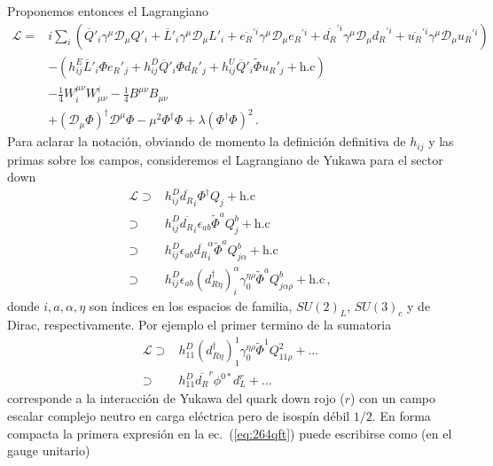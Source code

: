 \begin{frame}
Proponemos entonces el Lagrangiano
\begin{align}
\label{eq:265qft} 
    \mathcal{L}=&i\sum_i\left(\overline{Q}'_i\gamma^\mu\mathcal{D}_\mu Q'_i+\overline{L}'_i\gamma^\mu\mathcal{D}_\mu L'_i+
\overline{e_R}^{\prime i}\gamma^\mu\mathcal{D}_\mu {e_R}^{\prime i}+\overline{d_R}^{\prime i}\gamma^\mu\mathcal{D}_\mu {d_R}^{\prime i}+\overline{u_R}^{\prime i}\gamma^\mu\mathcal{D}_\mu {u_R}^{\prime i}\right)
\nonumber\\
     &-(h_{ij}^E\overline{L}'_i\Phi {e_R}'_j+h_{ij}^D\overline{Q}'_i\Phi {d_R}'_j+h_{ij}^U\overline{Q}'_i\widetilde{\Phi}{u_R}'_j+\text{h.c})\nonumber\\
     &-\tfrac{1}{4}W^{\mu\nu}_i W_{\mu\nu}^i-\tfrac{1}{4}B^{\mu\nu} B_{\mu\nu}\nonumber\\
     &+(\mathcal{D}_\mu\Phi)^\dagger\mathcal{D}^\mu\Phi-\mu^2\Phi^\dagger\Phi+\lambda(\Phi^\dagger\Phi)^2\,.
\end{align}
Para aclarar la notación, obviando de momento la definición definitiva de $h_{ij}$ y las primas sobre los campos, consideremos el Lagrangiano de Yukawa para el sector down
\begin{align}
  \label{eq:264qft}
  \mathcal{L}\supset&h^D_{ij}\overline{d_R}_i\Phi^\dagger Q_j+\text{h.c}\nonumber\\
\supset&h^D_{ij}\overline{d_R}_i\epsilon_{ab}\widetilde{\Phi}^aQ_j^b+\text{h.c}\nonumber\\
\supset&h^D_{ij}\epsilon_{ab}\overline{d_R}_i^\alpha\widetilde{\Phi}^aQ_{j\alpha}^b+\text{h.c}\nonumber\\
\supset&h^D_{ij}\epsilon_{ab}{(d_{R\eta}^\dagger)}_i^\alpha\gamma_0^{\eta\rho}\widetilde{\Phi}^aQ_{j\alpha\rho}^b+\text{h.c}\,,
\end{align}
donde $i,a,\alpha,\eta$ son índices en los espacios de familia, $SU(2)_L$, $SU(3)_c$ y de Dirac, respectivamente. Por ejemplo el primer termino de la sumatoria 
\begin{align}
\mathcal{L}\supset&h^D_{11}{(d_{R\eta}^\dagger)}_1^1\gamma_0^{\eta\rho}\widetilde{\Phi}^1Q_{11\rho}^2+\ldots\nonumber\\
\supset&h^D_{11}\overline{d_R}^r\phi^{0*}d_{L}^r+\ldots\,
\end{align}
corresponde a la interacción de Yukawa del quark down rojo ($r$) con un campo escalar complejo neutro en carga eléctrica pero de isospín débil $1/2$. En forma compacta la primera expresión en la ec.~(\ref{eq:264qft}) puede escribirse como (en el gauge unitario)
\begin{align}

\end{align}
\end{frame}
